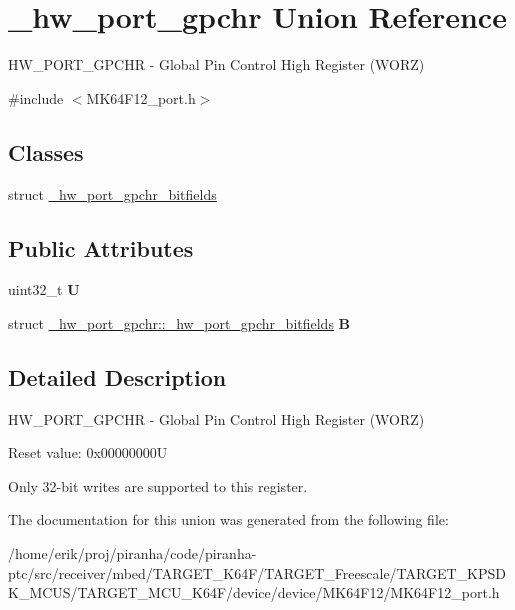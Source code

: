 \hypertarget{union__hw__port__gpchr}{}\section{\+\_\+hw\+\_\+port\+\_\+gpchr Union Reference}
\label{union__hw__port__gpchr}


H\+W\+\_\+\+P\+O\+R\+T\+\_\+\+G\+P\+C\+HR -\/ Global Pin Control High Register (W\+O\+RZ)  




{\ttfamily \#include $<$M\+K64\+F12\+\_\+port.\+h$>$}

\subsection*{Classes}
\begin{DoxyCompactItemize}
\item 
struct \hyperlink{struct__hw__port__gpchr_1_1__hw__port__gpchr__bitfields}{\+\_\+hw\+\_\+port\+\_\+gpchr\+\_\+bitfields}
\end{DoxyCompactItemize}
\subsection*{Public Attributes}
\begin{DoxyCompactItemize}
\item 
uint32\+\_\+t {\bfseries U}\hypertarget{union__hw__port__gpchr_a8a6fdc312158587a9bf1034040454b5d}{}\label{union__hw__port__gpchr_a8a6fdc312158587a9bf1034040454b5d}

\item 
struct \hyperlink{struct__hw__port__gpchr_1_1__hw__port__gpchr__bitfields}{\+\_\+hw\+\_\+port\+\_\+gpchr\+::\+\_\+hw\+\_\+port\+\_\+gpchr\+\_\+bitfields} {\bfseries B}\hypertarget{union__hw__port__gpchr_aae14138502c41d835ebe1efce7621e38}{}\label{union__hw__port__gpchr_aae14138502c41d835ebe1efce7621e38}

\end{DoxyCompactItemize}


\subsection{Detailed Description}
H\+W\+\_\+\+P\+O\+R\+T\+\_\+\+G\+P\+C\+HR -\/ Global Pin Control High Register (W\+O\+RZ) 

Reset value\+: 0x00000000U

Only 32-\/bit writes are supported to this register. 

The documentation for this union was generated from the following file\+:\begin{DoxyCompactItemize}
\item 
/home/erik/proj/piranha/code/piranha-\/ptc/src/receiver/mbed/\+T\+A\+R\+G\+E\+T\+\_\+\+K64\+F/\+T\+A\+R\+G\+E\+T\+\_\+\+Freescale/\+T\+A\+R\+G\+E\+T\+\_\+\+K\+P\+S\+D\+K\+\_\+\+M\+C\+U\+S/\+T\+A\+R\+G\+E\+T\+\_\+\+M\+C\+U\+\_\+\+K64\+F/device/device/\+M\+K64\+F12/M\+K64\+F12\+\_\+port.\+h\end{DoxyCompactItemize}
